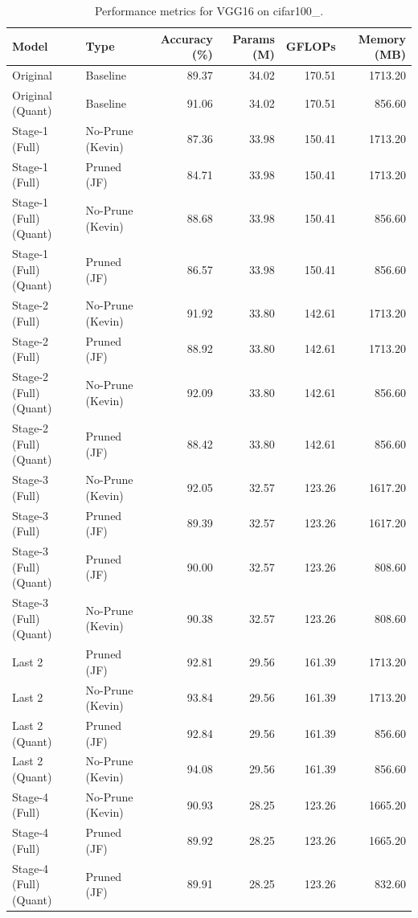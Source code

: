 \begin{table}
\caption{Performance metrics for VGG16 on cifar100_.}
\label{tab:VGG16_cifar100_}
\begin{tabular}{llrrrr}
\toprule
Model & Type & Accuracy (\%) & Params (M) & GFLOPs & Memory (MB) \\
\midrule
Original & Baseline & 89.37 & 34.02 & 170.51 & 1713.20 \\
Original
(Quant) & Baseline & 91.06 & 34.02 & 170.51 & 856.60 \\
Stage-1 (Full) & No-Prune (Kevin) & 87.36 & 33.98 & 150.41 & 1713.20 \\
Stage-1 (Full) & Pruned (JF) & 84.71 & 33.98 & 150.41 & 1713.20 \\
Stage-1 (Full)
(Quant) & No-Prune (Kevin) & 88.68 & 33.98 & 150.41 & 856.60 \\
Stage-1 (Full)
(Quant) & Pruned (JF) & 86.57 & 33.98 & 150.41 & 856.60 \\
Stage-2 (Full) & No-Prune (Kevin) & 91.92 & 33.80 & 142.61 & 1713.20 \\
Stage-2 (Full) & Pruned (JF) & 88.92 & 33.80 & 142.61 & 1713.20 \\
Stage-2 (Full)
(Quant) & No-Prune (Kevin) & 92.09 & 33.80 & 142.61 & 856.60 \\
Stage-2 (Full)
(Quant) & Pruned (JF) & 88.42 & 33.80 & 142.61 & 856.60 \\
Stage-3 (Full) & No-Prune (Kevin) & 92.05 & 32.57 & 123.26 & 1617.20 \\
Stage-3 (Full) & Pruned (JF) & 89.39 & 32.57 & 123.26 & 1617.20 \\
Stage-3 (Full)
(Quant) & Pruned (JF) & 90.00 & 32.57 & 123.26 & 808.60 \\
Stage-3 (Full)
(Quant) & No-Prune (Kevin) & 90.38 & 32.57 & 123.26 & 808.60 \\
Last 2 & Pruned (JF) & 92.81 & 29.56 & 161.39 & 1713.20 \\
Last 2 & No-Prune (Kevin) & 93.84 & 29.56 & 161.39 & 1713.20 \\
Last 2
(Quant) & Pruned (JF) & 92.84 & 29.56 & 161.39 & 856.60 \\
Last 2
(Quant) & No-Prune (Kevin) & 94.08 & 29.56 & 161.39 & 856.60 \\
Stage-4 (Full) & No-Prune (Kevin) & 90.93 & 28.25 & 123.26 & 1665.20 \\
Stage-4 (Full) & Pruned (JF) & 89.92 & 28.25 & 123.26 & 1665.20 \\
Stage-4 (Full)
(Quant) & Pruned (JF) & 89.91 & 28.25 & 123.26 & 832.60 \\

\end{tabular}
\end{table}
